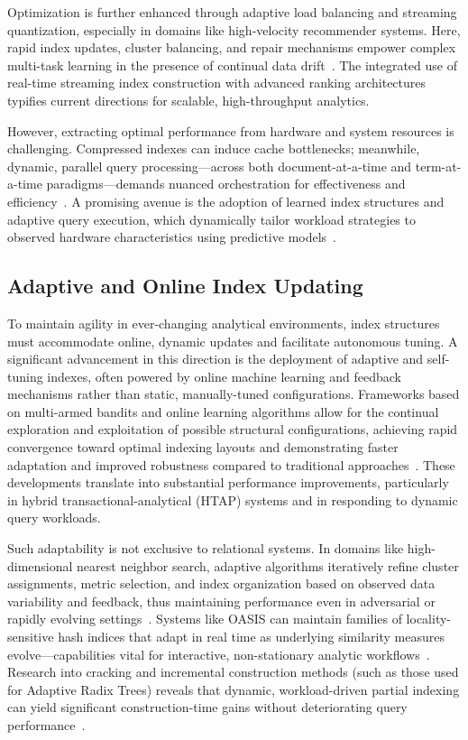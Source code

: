 \documentclass[11pt]{article}
\begin{document}
Optimization is further enhanced through adaptive load balancing and streaming quantization, especially in domains like high-velocity recommender systems. Here, rapid index updates, cluster balancing, and repair mechanisms empower complex multi-task learning in the presence of continual data drift~\cite{ref75}. The integrated use of real-time streaming index construction with advanced ranking architectures typifies current directions for scalable, high-throughput analytics.

However, extracting optimal performance from hardware and system resources is challenging. Compressed indexes can induce cache bottlenecks; meanwhile, dynamic, parallel query processing—across both document-at-a-time and term-at-a-time paradigms—demands nuanced orchestration for effectiveness and efficiency~\cite{ref32, ref94}. A promising avenue is the adoption of learned index structures and adaptive query execution, which dynamically tailor workload strategies to observed hardware characteristics using predictive models~\cite{ref29, ref70, ref97, ref118}.

\subsection{Adaptive and Online Index Updating}

To maintain agility in ever-changing analytical environments, index structures must accommodate online, dynamic updates and facilitate autonomous tuning. A significant advancement in this direction is the deployment of adaptive and self-tuning indexes, often powered by online machine learning and feedback mechanisms rather than static, manually-tuned configurations. Frameworks based on multi-armed bandits and online learning algorithms allow for the continual exploration and exploitation of possible structural configurations, achieving rapid convergence toward optimal indexing layouts and demonstrating faster adaptation and improved robustness compared to traditional approaches~\cite{ref79, ref80, ref105}. These developments translate into substantial performance improvements, particularly in hybrid transactional-analytical (HTAP) systems and in responding to dynamic query workloads.

Such adaptability is not exclusive to relational systems. In domains like high-dimensional nearest neighbor search, adaptive algorithms iteratively refine cluster assignments, metric selection, and index organization based on observed data variability and feedback, thus maintaining performance even in adversarial or rapidly evolving settings~\cite{ref110}. Systems like OASIS can maintain families of locality-sensitive hash indices that adapt in real time as underlying similarity measures evolve—capabilities vital for interactive, non-stationary analytic workflows~\cite{ref110}. Research into cracking and incremental construction methods (such as those used for Adaptive Radix Trees) reveals that dynamic, workload-driven partial indexing can yield significant construction-time gains without deteriorating query performance~\cite{ref109}.
\end{document}
